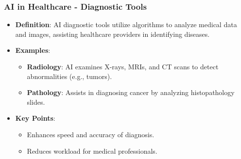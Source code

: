 \documentclass{beamer}
\begin{document}
\begin{frame}[fragile]
    \frametitle{AI in Healthcare - Diagnostic Tools}
    \begin{itemize}
        \item \textbf{Definition}: AI diagnostic tools utilize algorithms to analyze medical data and images, assisting healthcare providers in identifying diseases.
        \item \textbf{Examples}:
        \begin{itemize}
            \item \textbf{Radiology}: AI examines X-rays, MRIs, and CT scans to detect abnormalities (e.g., tumors).
            \item \textbf{Pathology}: Assists in diagnosing cancer by analyzing histopathology slides.
        \end{itemize}
        \item \textbf{Key Points}:
        \begin{itemize}
            \item Enhances speed and accuracy of diagnosis.
            \item Reduces workload for medical professionals.
        \end{itemize}
    \end{itemize}
\end{frame}
\end{document}
